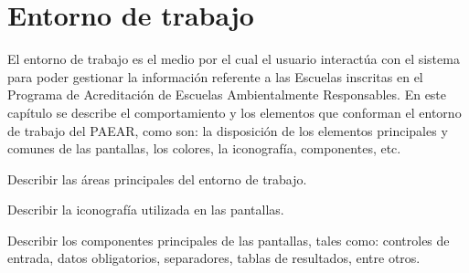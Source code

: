 
\section{Entorno de trabajo}

    El entorno de trabajo es el medio por el cual el usuario interactúa con el sistema para poder gestionar la información referente a las Escuelas inscritas en el Programa de Acreditación de Escuelas Ambientalmente Responsables. En este capítulo se describe el comportamiento y los elementos que conforman el entorno de 
    trabajo del PAEAR, como son: la disposición de los elementos principales y comunes de las pantallas, los colores, la iconografía, componentes, etc. \bigskip

    \begin{objetivos}
      \item Describir las áreas principales del entorno de trabajo.
      \item Describir la iconografía utilizada en las pantallas.
      \item Describir los componentes principales de las pantallas, tales como: controles de entrada, datos obligatorios, separadores, tablas de resultados, entre otros.
    \end{objetivos}
\\\\\\\\\\\\\\\\

\pagebreak
{}